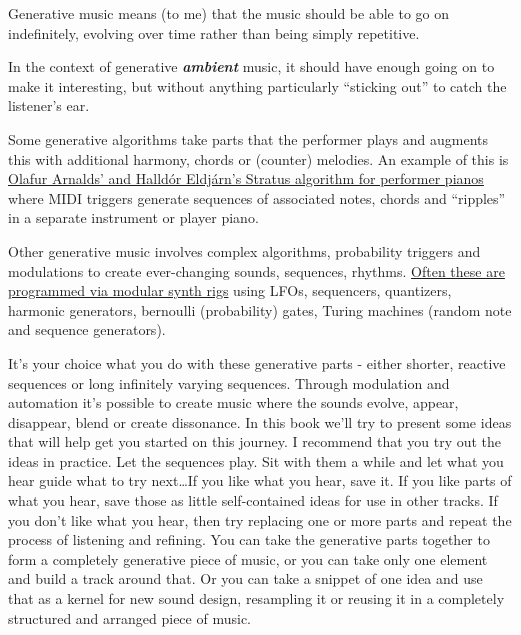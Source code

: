 \documentclass[
  12pt,
  letterpaper,
  oneside,
  open=any]{scrbook}
\begin{document}
\begin{tcolorbox}[enhanced jigsaw, colback=white, rightrule=.15mm, toprule=.15mm, arc=.35mm, opacitybacktitle=0.6, coltitle=black, leftrule=.75mm, bottomtitle=1mm, toptitle=1mm, left=2mm, bottomrule=.15mm, titlerule=0mm, colbacktitle=quarto-callout-tip-color!10!white, colframe=quarto-callout-tip-color-frame, title=\textcolor{quarto-callout-tip-color}{\faLightbulb}\hspace{0.5em}{Key idea}, breakable, opacityback=0]

Generative music means (to me) that the music should be able to go on
indefinitely, evolving over time rather than being simply repetitive.

In the context of generative \textbf{\emph{ambient}} music, it should
have enough going on to make it interesting, but without anything
particularly ``sticking out'' to catch the listener's ear.

\end{tcolorbox}

Some generative algorithms take parts that the performer plays and
augments this with additional harmony, chords or (counter) melodies. An
example of this is
\href{https://www.youtube.com/watch?v=ktxkEBT5CB0}{Olafur Arnalds' and
Halldór Eldjárn's Stratus algorithm for performer pianos} where MIDI
triggers generate sequences of associated notes, chords and ``ripples''
in a separate instrument or player piano.

Other generative music involves complex algorithms, probability triggers
and modulations to create ever-changing sounds, sequences, rhythms.
\href{https://www.youtube.com/watch?v=uNz1XfVfJak}{Often these are
programmed via modular synth rigs} using LFOs, sequencers, quantizers,
harmonic generators, bernoulli (probability) gates, Turing machines
(random note and sequence generators).

It's your choice what you do with these generative parts - either
shorter, reactive sequences or long infinitely varying sequences.
Through modulation and automation it's possible to create music where
the sounds evolve, appear, disappear, blend or create dissonance. In
this book we'll try to present some ideas that will help get you started
on this journey. I recommend that you try out the ideas in practice. Let
the sequences play. Sit with them a while and let what you hear guide
what to try next\ldots If you like what you hear, save it. If you like
parts of what you hear, save those as little self-contained ideas for
use in other tracks. If you don't like what you hear, then try replacing
one or more parts and repeat the process of listening and refining. You
can take the generative parts together to form a completely generative
piece of music, or you can take only one element and build a track
around that. Or you can take a snippet of one idea and use that as a
kernel for new sound design, resampling it or reusing it in a completely
structured and arranged piece of music.
\end{document}
